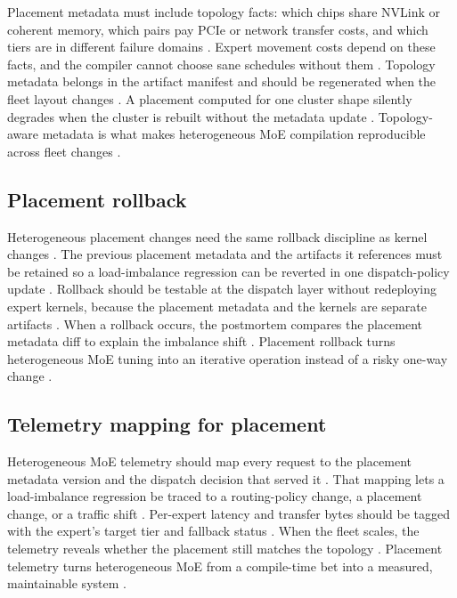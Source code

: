 Placement metadata must include topology facts: which chips share NVLink or coherent memory, which pairs pay PCIe or network transfer costs, and which tiers are in different failure domains \citep{liu2024deepseekv3,patel2025llminference,chen2020compilerbasedhardw}. Expert movement costs depend on these facts, and the compiler cannot choose sane schedules without them \citep{memoryfloor2026,taxbreak2026}. Topology metadata belongs in the artifact manifest and should be regenerated when the fleet layout changes \citep{patel2025llminference,memoryfloor2026}. A placement computed for one cluster shape silently degrades when the cluster is rebuilt without the metadata update \citep{chen2020compilerbasedhardw,patel2025llminference}. Topology-aware metadata is what makes heterogeneous MoE compilation reproducible across fleet changes \citep{liu2024deepseekv3,memoryfloor2026}.

\subsection{Placement rollback}

Heterogeneous placement changes need the same rollback discipline as kernel changes \citep{patel2025llminference,memoryfloor2026,chen2020compilerbasedhardw}. The previous placement metadata and the artifacts it references must be retained so a load-imbalance regression can be reverted in one dispatch-policy update \citep{liu2024deepseekv3,taxbreak2026}. Rollback should be testable at the dispatch layer without redeploying expert kernels, because the placement metadata and the kernels are separate artifacts \citep{chen2020compilerbasedhardw,patel2025llminference}. When a rollback occurs, the postmortem compares the placement metadata diff to explain the imbalance shift \citep{liu2024deepseekv3,memoryfloor2026}. Placement rollback turns heterogeneous MoE tuning into an iterative operation instead of a risky one-way change \citep{patel2025llminference,memoryfloor2026}.

\subsection{Telemetry mapping for placement}

Heterogeneous MoE telemetry should map every request to the placement metadata version and the dispatch decision that served it \citep{liu2024deepseekv3,patel2025llminference,memoryfloor2026}. That mapping lets a load-imbalance regression be traced to a routing-policy change, a placement change, or a traffic shift \citep{chen2020compilerbasedhardw,taxbreak2026}. Per-expert latency and transfer bytes should be tagged with the expert's target tier and fallback status \citep{patel2025llminference,memoryfloor2026}. When the fleet scales, the telemetry reveals whether the placement still matches the topology \citep{liu2024deepseekv3,memoryfloor2026}. Placement telemetry turns heterogeneous MoE from a compile-time bet into a measured, maintainable system \citep{chen2020compilerbasedhardw,patel2025llminference}.

